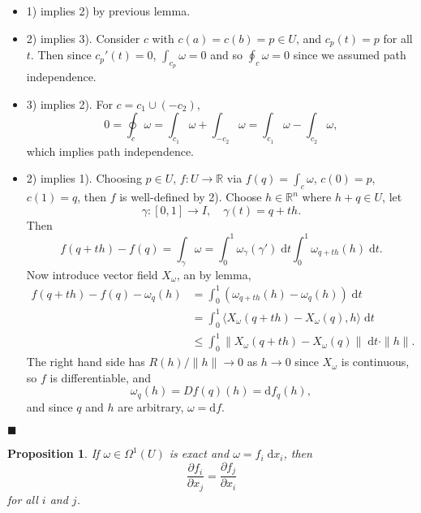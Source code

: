 \documentclass[letter-paper]{tufte-book}
\newtheorem{proposition}[theorem]{\color{pastel-blue}Proposition}
\newenvironment{proof}[1][Proof]{\begin{trivlist}
\item[\hskip \labelsep {\bfseries #1}]}{\end{trivlist}}
\newcommand{\qed}{\hfill$\blacksquare$}
\begin{document}
\begin{proof}
  \begin{itemize}
    \item 1) implies 2) by previous lemma.
    \item 2) implies 3). Consider $c$ with $c(a) = c(b) = p \in U$, and $c_p(t)
    = p$ for all $t$. Then since $c_p'(t) = 0$, $\int_{c_p} \omega = 0$ and so
    $\oint_c \omega = 0$ since we assumed path independence.
    \item 3) implies 2). For $c = c_1 \cup (-c_2)$,
    \begin{equation*}
      0 = \oint_c \omega = \int_{c_1} \omega + \int_{-c_2} \omega = \int_{c_1} \omega - \int_{c_2} \omega,
    \end{equation*}
    which implies path independence.
    \item 2) implies 1). Choosing $p \in U$, $f: U \to \mathbb{R}$ via $f(q) =
    \int_c \omega$, $c(0) = p$, $c(1) = q$, then $f$ is well-defined by 2).
    Choose $h \in \mathbb{R}^n$ where $h + q \in U$, let
    \begin{equation*}
      \gamma : [0, 1] \to I, \quad \gamma(t) = q + th.
    \end{equation*}
    Then
    \begin{equation*}
      f(q+th) - f(q) = \int_\gamma \omega = \int_0^1 \omega_\gamma(\gamma')\; \mathrm{d}t \int_0^1 \omega_{q+th}(h)\; \mathrm{d}t.
    \end{equation*}
    Now introduce vector field $X_\omega$, an by lemma,
    \begin{align*}
      f(q+th) - f(q) - \omega_q(h) &= \int_0^1 \left(\omega_{q+th}(h) - \omega_q(h)\right)\; \mathrm{d}t\\
        & =\int_0^1 \langle X_\omega (q+th) - X_\omega (q), h\rangle \; \mathrm{d}t\\
        & \leq \int_0^1 \left\| X_\omega (q+th) - X_\omega (q)\right\|\; \mathrm{d}t \cdot \|h\|.
    \end{align*}
    The right hand side has $R(h) / \|h\| \to 0$ as $h\to 0$ since $X_\omega$ is
    continuous, so $f$ is differentiable, and
    \begin{equation*}
      \omega_q(h) = Df(q)(h) = \mathrm{d}f_q (h),
    \end{equation*}
    and since $q$ and $h$ are arbitrary, $\omega = \mathrm{d}f$.
  \end{itemize}
  \qed
\end{proof}

\begin{proposition}
  If $\omega \in \Omega^1(U)$ is exact and $\omega = f_i\; \mathrm{d}x_i$, then
  \begin{equation*}
    \frac{\partial f_i}{\partial x_j} = \frac{\partial f_j}{\partial x_i}
  \end{equation*}
  for all $i$ and $j$.
\end{proposition}
\end{document}
